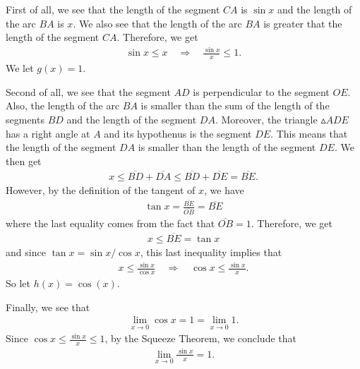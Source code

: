 \documentclass[12pt]{article}
\newcommand{\ra}{\rightarrow}
\begin{document}
	First of all, we see that the length of the segment $CA$ is $\sin x$ and the length of the arc $BA$ is $x$. We also see that the length of the arc $BA$ is greater that the length of the segment $CA$. Therefore, we get
		\begin{align*}
		\sin x \leq x \quad \Rightarrow \quad \frac{\sin x}{x} \leq 1 .
		\end{align*}
	We let $g(x) = 1$.
	
	Second of all, we see that the segment $AD$ is perpendicular to the segment $OE$. Also, the length of the arc $BA$ is smaller than the sum of the length of the segments $BD$ and the length of the segment $DA$. Moreover, the triangle $\vartriangle ADE$ has a right angle at $A$ and its hypothenus is the segment $DE$. This means that the length of the segment $DA$ is smaller than the length of the segment $DE$. We then get
		\begin{align*}
		x \leq \overline{BD} + \overline{DA} \leq \overline{BD} + \overline{DE} = \overline{BE} .
		\end{align*}
	However, by the definition of the tangent of $x$, we have
		\begin{align*}
		\tan x = \frac{\overline{BE}}{\overline{OB}} = \overline{BE}
		\end{align*}
	where the last equality comes from the fact that $\overline{OB} = 1$. Therefore, we get
		\begin{align*}
		x \leq \overline{BE} = \tan x
		\end{align*}
	and since $\tan x = \sin x / \cos x$, this last inequality implies that
		\begin{align*}
		x \leq \frac{\sin x }{\cos x} \quad \Rightarrow \quad \cos x \leq \frac{\sin x}{x} .
		\end{align*}
	So let $h (x) = \cos (x)$.
	
	Finally, we see that 
		\begin{align*}
		\lim_{x \ra 0} \cos x = 1 = \lim_{x \ra 0} 1 .
		\end{align*}
	Since $\cos x \leq \frac{\sin x}{x} \leq 1$, by the Squeeze Theorem, we conclude that
		\begin{align*}
		\lim_{x \ra 0} \frac{\sin x}{x} = 1 .
		\end{align*}
\end{document}

